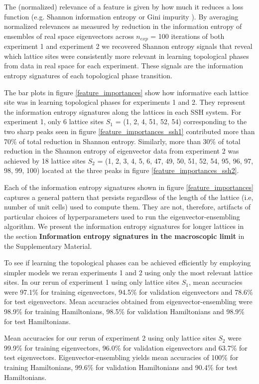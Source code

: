 \documentclass[fleqn,10pt]{wlscirep}
\begin{document}
The (normalized) relevance of a feature is given by how much it reduces a loss function (e.g. Shannon information entropy or Gini impurity \cite{friedman2001elements}). By averaging normalized relevances as measured by reduction in the information entropy of ensembles of real space eigenvectors across $n_{exp}$ = 100 iterations of both experiment 1 and experiment 2 we recovered Shannon entropy signals that reveal which lattice sites were consistently more relevant in learning topological phases from data in real space for each experiment. These signals are the information entropy signatures of each topological phase transition. 

The bar plots in figure \ref{feature_importances} show how informative each lattice site was in learning topological phases for experiments 1 and 2. They represent the information entropy signatures along the lattices in each SSH system. For experiment 1, only 6 lattice sites $S_1$ = (1, 2, 4, 51, 52, 54) corresponding to the two sharp peaks seen in figure \ref{feature_importances_ssh1} contributed more than 70\% of total reduction in Shannon entropy. Similarly, more than 30\% of total reduction in the Shannon entropy of eigenvector data from experiment 2 was achieved by 18 lattice sites $S_2$ = (1, 2, 3, 4, 5, 6, 47, 49, 50, 51, 52, 54, 95, 96, 97, 98, 99, 100) located at the three peaks in figure \ref{feature_importances_ssh2}.

Each of the information entropy signatures shown in figure \ref{feature_importances} captures a general pattern that persists regardless of the length of the lattice (i.e, number of unit cells) used to compute them. They are not, therefore, artifacts of particular choices of hyperparameters used to run the eigenvector-ensembling algorithm. We present the information entropy signatures for longer lattices in the section \textbf{Information entropy signatures in the macroscopic limit} in the Supplementary Material.

To see if learning the topological phases can be achieved efficiently by employing simpler models we reran experiments 1 and 2 using only the most relevant lattice sites. In our rerun of experiment 1 using only lattice sites $S_1$, mean accuracies were 97.1\% for training eigenvectors, 94.5\% for validation eigenvectors and 78.6\% for test eigenvectors. Mean accuracies obtained from eigenvector-ensembling were 98.9\% for training Hamiltonians, 98.5\% for validation Hamiltonians and 98.9\% for test Hamiltonians.

Mean accuracies for our rerun of experiment 2 using only lattice sites $S_2$ were 99.9\% for training eigenvectors, 96.0\% for validation eigenvectors and 63.7\% for test eigenvectors. Eigenvector-ensembling yields mean accuracies of 100\% for training Hamiltonians, 99.6\% for validation Hamiltonians and 90.4\% for test Hamiltonians.
\end{document}
